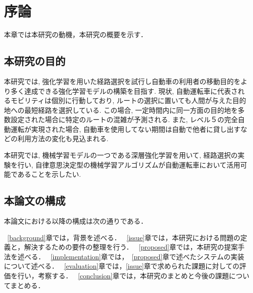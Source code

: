 \chapter{序論}
\label{introduction}

本章では本研究の動機，本研究の概要を示す．

\section{本研究の目的}

本研究では, 強化学習を用いた経路選択を試行し自動車の利用者の移動目的をより多く達成できる強化学習モデルの構築を目指す.
現状, 自動運転車に代表されるモビリティは個別に行動しており, ルートの選択に置いても人間が与えた目的地への最短経路を選択している.
この場合, 一定時間内に同一方面の目的地を多数設定された場合に特定のルートの混雑が予測される. 
また, レベル５の完全自動運転が実現された場合, 自動車を使用してない期間は自動で他者に貸し出すなどの利用方法の変化も見込まれる.

本研究では, 機械学習モデルの一つである深層強化学習を用いて, 経路選択の実験を行い, 自律意思決定型の機械学習アルゴリズムが自動運転車において活用可能であることを示したい.


\section{本論文の構成}

本論文における以降の構成は次の通りである．

~\ref{background}章では，背景を述べる．
~\ref{issue}章では，本研究における問題の定義と，解決するための要件の整理を行う．
~\ref{proposed}章では，本研究の提案手法を述べる．
~\ref{implementation}章では，~\ref{proposed}章で述べたシステムの実装について述べる．
~\ref{evaluation}章では，\ref{issue}章で求められた課題に対しての評価を行い，考察する．
~\ref{conclusion}章では，本研究のまとめと今後の課題についてまとめる．


